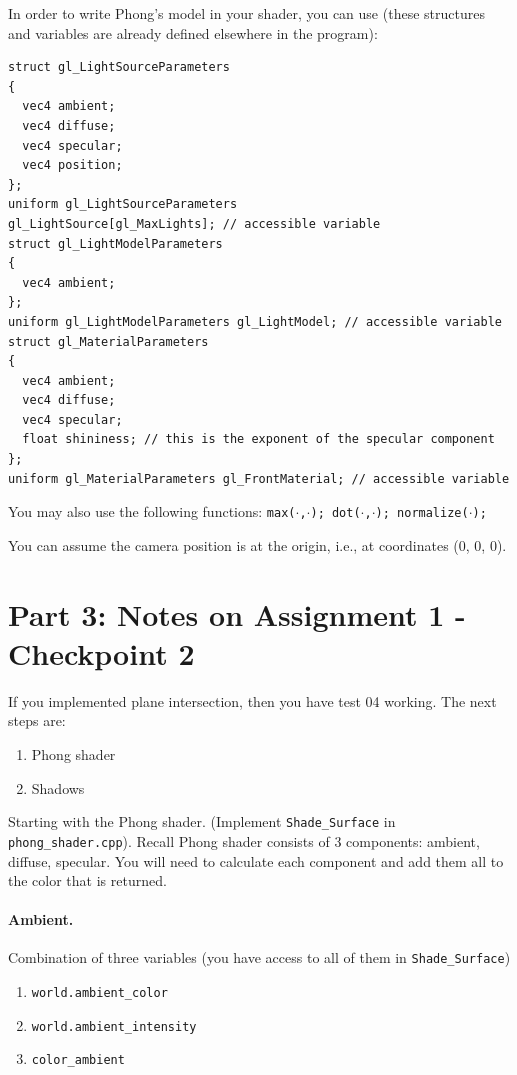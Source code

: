 \documentclass[12pt]{article}
\begin{document}
In order to write Phong's model in your shader, you can use (these structures and variables are already defined elsewhere in the program):

\begin{lstlisting}
struct gl_LightSourceParameters
{
  vec4 ambient;
  vec4 diffuse;
  vec4 specular;
  vec4 position;
};
uniform gl_LightSourceParameters
gl_LightSource[gl_MaxLights]; // accessible variable
struct gl_LightModelParameters
{
  vec4 ambient;
};
uniform gl_LightModelParameters gl_LightModel; // accessible variable
struct gl_MaterialParameters
{
  vec4 ambient;
  vec4 diffuse;
  vec4 specular;
  float shininess; // this is the exponent of the specular component
};
uniform gl_MaterialParameters gl_FrontMaterial; // accessible variable
\end{lstlisting}

You may also use the following functions: \texttt{max($\cdot$,$\cdot$); dot($\cdot$,$\cdot$);
normalize($\cdot$);}

You can assume the camera position is at the origin, i.e., at coordinates (0, 0,
0).

\section*{Part 3: Notes on Assignment 1 - Checkpoint 2}

If you implemented plane intersection, then you have test 04 working.  The next
steps are:

\begin{enumerate}
\item Phong shader
\item Shadows
\end{enumerate}

Starting with the Phong shader.  (Implement \texttt{Shade\_Surface} in
\texttt{phong\_shader.cpp}). Recall Phong shader consists of 3 components:
ambient, diffuse, specular. You will need to calculate each component and add
them all to the color that is returned.

\paragraph*{Ambient.} Combination of three variables (you have access to all of
them in \texttt{Shade\_Surface})
\begin{enumerate}
\item \texttt{world.ambient\_color}
\item \texttt{world.ambient\_intensity}
\item \texttt{color\_ambient}
\end{enumerate}
\end{document}
